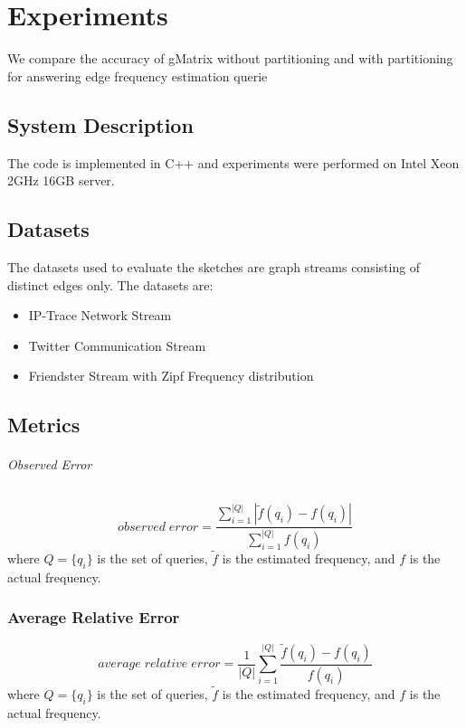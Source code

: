 \chapter{Experiments}

\ifpdf
    \graphicspath{{Chapter3/Figs/Raster/}{Chapter3/Figs/PDF/}{Chapter3/Figs/}}
\else
    \graphicspath{{Chapter3/Figs/Vector/}{Chapter3/Figs/}}
\fi

We compare the accuracy of gMatrix without partitioning and with partitioning for answering edge frequency estimation querie

\section{System Description}
The code is implemented in C++ and experiments were performed on Intel Xeon 2GHz 16GB server.

\section{Datasets}
The datasets used to evaluate the sketches are graph streams consisting of distinct edges only. The datasets are:
\begin{itemize}
\item IP-Trace Network Stream \cite{khan}
\item Twitter Communication Stream \cite{khan}
\item Friendster Stream with Zipf Frequency distribution \cite{khan}
\end{itemize}

\section{Metrics}
\subparagraph{Observed Error \cite{khan}}
\[
observed\;error = \frac{ \sum_{i=1}^{|Q|}{|\tilde{f}(q_i) - f(q_i)|} }{\sum_{i=1}^{|Q|}f(q_i)}
\]
where $Q = \{q_i\}$ is the set of queries, $\tilde{f}$ is the estimated frequency, and $f$ is the actual frequency.

\subsection{Average Relative Error \cite{DBLP}}
\[
average\;relative\;error = \frac{1}{|Q|} \sum_{i=1}^{|Q|} \frac{\tilde{f}(q_i)-f(q_i)}{f(q_i)}
\]
where $Q = \{q_i\}$ is the set of queries, $\tilde{f}$ is the estimated frequency, and $f$ is the actual frequency.

